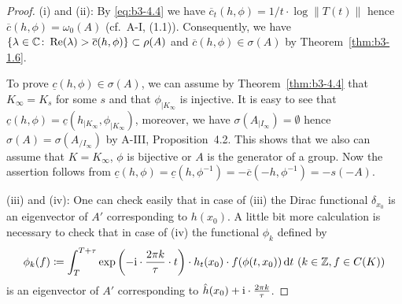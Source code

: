 \begin{proof}	
	(i) and (ii): By \eqref{eq:b3-4.4} we have $\overline{c}_{t}(h,\phi) = 1/t\cdot\log\|T(t)\|$ hence $\overline{c}(h,\phi) = \omega_{0}(A)$ (cf.\ A-I, (1.1)).  
	Consequently, we have $\{\lambda \in \mathbb{C} \colon \mathop{}\!\mathrm{Re}(\lambda) > \overline{c}(h,\phi)\} \subset \rho(A)$ and $\overline{c}(h,\phi) \in \sigma(A)$ by Theorem~\ref{thm:b3-1.6}.
	
	To prove $\underline{c}(h,\phi) \in \sigma(A)$, we can assume by Theorem~\ref{thm:b3-4.4} that $K_{\infty} = K_{s}$ for some $s$ and that $\phi_{|K_{\infty}}$ is injective.
	It is easy to see that $\underline{c}(h,\phi) = \underline{c}(h_{|K_{\infty}},\phi_{|K_{\infty}})$, moreover, we have $\sigma(A_{|I_{\infty}}) = \emptyset$ hence $\sigma(A) = \sigma(A_{/I_{\infty}})$ by A-III, Proposition~4.2.
	This shows that we also can assume that $K = K_{\infty}$, \ie $\phi$ is bijective or $A$ is the generator of a group.
	Now the assertion follows from $\underline{c}(h,\phi) = \underline{c}(h,\phi^{-1}) = -\overline{c}(-h,\phi^{-1}) = -s(-A)$.
	
	(iii) and (iv): One can check easily that in case of (iii) the Dirac functional $\delta_{x_{0}}$ is an eigenvector of $A'$ corresponding to $h(x_{0})$.
    A little bit more calculation is necessary to check that in case of (iv) the functional $\phi_{k}$ defined by
\[
	\phi_{k}(f) \coloneq \int_{T}^{T+\tau} \exp\left(-\mathrm{i}\cdot\frac{2\pi k}{\tau}\cdot t\right)\cdot h_{t}(x_{0})\cdot f(\phi(t,x_{0})) \mathop{}\!\mathrm{d}{t}  \ (k \in \mathbb{Z}, f \in C(K))
\]
    is an eigenvector of $A'$ corresponding to $\hat{h}(x_{0}) + \mathrm{i}\cdot\frac{2\pi k}{\tau}$.


\end{proof}
